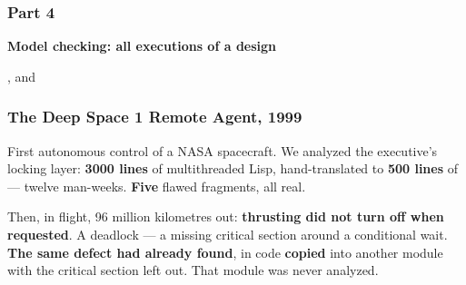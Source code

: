 \begin{frame}
  \frametitle{Part 4}

\iconmc[3.2]

\vspace{0.45cm}

{\Large\bf Model checking: all executions of a design}

\vspace{0.4cm}

{\small \spin{}, and }

\end{frame}

\begin{frame}
  \frametitle{The Deep Space 1 Remote Agent, 1999} \small

First autonomous control of a NASA spacecraft. We analyzed the executive's locking
layer: {\bf 3000 lines} of multithreaded Lisp, hand-translated to {\bf 500 lines} of
\promelaname{} --- twelve man-weeks. {\bf Five} flawed fragments, all real.

\pause
\vspace{0.3cm}

\begin{block}{}\small
Then, in flight, 96 million kilometres out: {\bf thrusting did not turn off when
requested}. A deadlock --- a missing critical section around a conditional wait. {\bf
The same defect \spin{} had already found}, in code {\bf copied} into another module
with the critical section left out. That module was never analyzed.
\end{block}

\end{frame}

